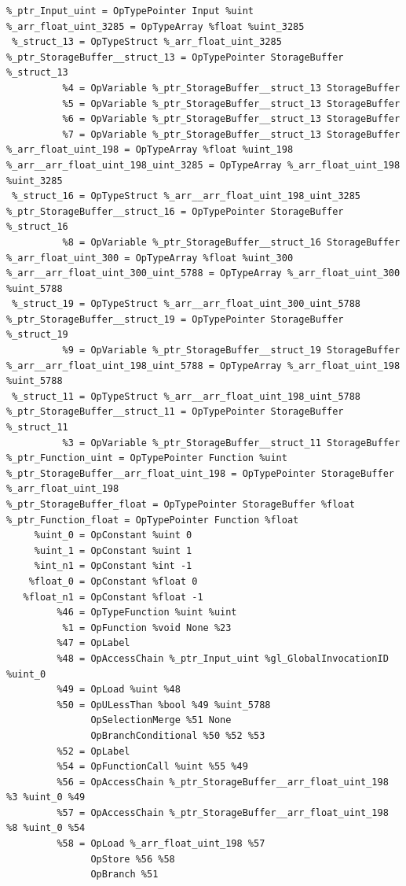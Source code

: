 \documentclass{IEEEtran}
\begin{document}
\begin{lstlisting}
%_ptr_Input_uint = OpTypePointer Input %uint
%_arr_float_uint_3285 = OpTypeArray %float %uint_3285
 %_struct_13 = OpTypeStruct %_arr_float_uint_3285
%_ptr_StorageBuffer__struct_13 = OpTypePointer StorageBuffer %_struct_13
          %4 = OpVariable %_ptr_StorageBuffer__struct_13 StorageBuffer
          %5 = OpVariable %_ptr_StorageBuffer__struct_13 StorageBuffer
          %6 = OpVariable %_ptr_StorageBuffer__struct_13 StorageBuffer
          %7 = OpVariable %_ptr_StorageBuffer__struct_13 StorageBuffer
%_arr_float_uint_198 = OpTypeArray %float %uint_198
%_arr__arr_float_uint_198_uint_3285 = OpTypeArray %_arr_float_uint_198 %uint_3285
 %_struct_16 = OpTypeStruct %_arr__arr_float_uint_198_uint_3285
%_ptr_StorageBuffer__struct_16 = OpTypePointer StorageBuffer %_struct_16
          %8 = OpVariable %_ptr_StorageBuffer__struct_16 StorageBuffer
%_arr_float_uint_300 = OpTypeArray %float %uint_300
%_arr__arr_float_uint_300_uint_5788 = OpTypeArray %_arr_float_uint_300 %uint_5788
 %_struct_19 = OpTypeStruct %_arr__arr_float_uint_300_uint_5788
%_ptr_StorageBuffer__struct_19 = OpTypePointer StorageBuffer %_struct_19
          %9 = OpVariable %_ptr_StorageBuffer__struct_19 StorageBuffer
%_arr__arr_float_uint_198_uint_5788 = OpTypeArray %_arr_float_uint_198 %uint_5788
 %_struct_11 = OpTypeStruct %_arr__arr_float_uint_198_uint_5788
%_ptr_StorageBuffer__struct_11 = OpTypePointer StorageBuffer %_struct_11
          %3 = OpVariable %_ptr_StorageBuffer__struct_11 StorageBuffer
%_ptr_Function_uint = OpTypePointer Function %uint
%_ptr_StorageBuffer__arr_float_uint_198 = OpTypePointer StorageBuffer %_arr_float_uint_198
%_ptr_StorageBuffer_float = OpTypePointer StorageBuffer %float
%_ptr_Function_float = OpTypePointer Function %float
     %uint_0 = OpConstant %uint 0
     %uint_1 = OpConstant %uint 1
     %int_n1 = OpConstant %int -1
    %float_0 = OpConstant %float 0
   %float_n1 = OpConstant %float -1
         %46 = OpTypeFunction %uint %uint
          %1 = OpFunction %void None %23
         %47 = OpLabel
         %48 = OpAccessChain %_ptr_Input_uint %gl_GlobalInvocationID %uint_0
         %49 = OpLoad %uint %48
         %50 = OpULessThan %bool %49 %uint_5788
               OpSelectionMerge %51 None
               OpBranchConditional %50 %52 %53
         %52 = OpLabel
         %54 = OpFunctionCall %uint %55 %49
         %56 = OpAccessChain %_ptr_StorageBuffer__arr_float_uint_198 %3 %uint_0 %49
         %57 = OpAccessChain %_ptr_StorageBuffer__arr_float_uint_198 %8 %uint_0 %54
         %58 = OpLoad %_arr_float_uint_198 %57
               OpStore %56 %58
               OpBranch %51

\end{lstlisting}
\end{document}
